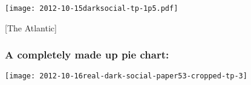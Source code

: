 

\begin{frame}



  \begin{center}
  \texttt{[image: 2012-10-15darksocial-tp-1p5.pdf]}

  \medskip

  \tiny {} [The Atlantic]
  \end{center}


\end{frame}

\begin{frame}
  \frametitle{A completely made up pie chart:}

  \begin{center}
    
    \texttt{[image: 2012-10-16real-dark-social-paper53-cropped-tp-3]}
  \end{center}

\end{frame}




